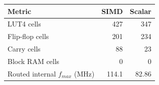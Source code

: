 \begin{tabular}{lrr}\hline Metric & SIMD & Scalar \\\hline
LUT4 cells & 427 & 347 \\
Flip-flop cells & 201 & 234 \\
Carry cells & 88 & 23 \\
Block RAM cells & 0 & 0 \\
Routed internal $f_{max}$ (MHz) & 114.1 & 82.86 \\
\hline\end{tabular}
